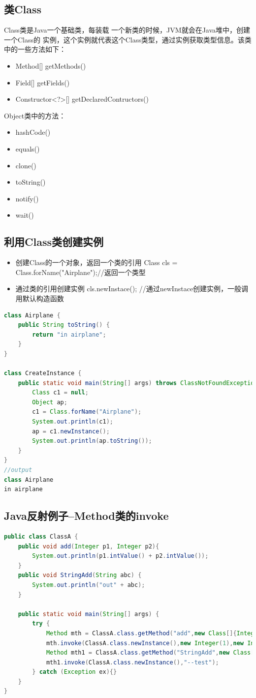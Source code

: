 \subsection{类Class}
Class类是Java一个基础类，每装载 一个新类的时候，JVM就会在Java堆中，创建一个Class的
实例，这个实例就代表这个Class类型，通过实例获取类型信息。该类中的一些方法如下：
\begin{itemize}
	\item Method[] getMethods()
	\item Field[] getFields()
	\item Constructor<?>[] getDeclaredContructors()
\end{itemize}
Object类中的方法：
\begin{itemize}
	\item hashCode()
	\item equals()
	\item clone()
	\item toString()
	\item notify()
	\item wait()
\end{itemize}
\subsection{利用Class类创建实例}
\begin{itemize}
	\item 创建Class的一个对象，返回一个类的引用
	\subitem
	Class cls = Class.forName("Airplane");//返回一个类型
	\item 通过类的引用创建实例
	\subitem
	cls.newInstace();
	//通过newInstace创建实例，一般调用默认构造函数
\end{itemize}
\begin{lstlisting}[language=java]
class Airplane {
	public String toString() {
		return "in airplane";
	}
}

class CreateInstance {
	public static void main(String[] args) throws ClassNotFoundException, IllegalAccessException, InstantiationException {
		Class c1 = null;
		Object ap;
		c1 = Class.forName("Airplane");
		System.out.println(c1);
		ap = c1.newInstance();
		System.out.println(ap.toString());
	}
}
//output
class Airplane
in airplane
\end{lstlisting}
\subsection{Java反射例子--Method类的invoke}
\begin{lstlisting}[language=java]
public class ClassA {
	public void add(Integer p1, Integer p2){
		System.out.println(p1.intValue() + p2.intValue());
	}
	public void StringAdd(String abc) {
		System.out.println("out" + abc);
	}
	
	public static void main(String[] args) {
		try {
			Method mth = ClassA.class.getMethod("add",new Class[]{Integer.class,Integer.class});
			mth.invoke(ClassA.class.newInstance(),new Integer(1),new Integer(2));
			Method mth1 = ClassA.class.getMethod("StringAdd",new Class[]{String.class});
			mth1.invoke(ClassA.class.newInstance(),"--test");
		} catch (Exception ex){}
	}
}
\end{lstlisting}

